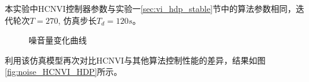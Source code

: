本实验中HCNVI控制器参数与实验一\ref{sec:vi_hdp_stable}节中的算法参数相同，迭代轮次$T=270$,
仿真步长$T_d=120s$。
\begin{figure}[htb]
    \caption{噪音量变化曲线}
    \label{fig:noise_noise_input}
\end{figure}
利用该仿真模型再次对比HCNVI与其他算法控制性能的差异，结果如图\ref{fig:noise_HCNVI_HDP}所示。
